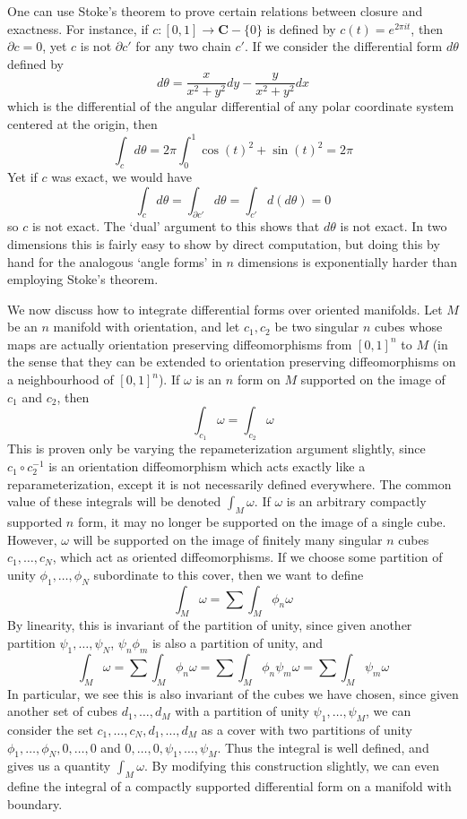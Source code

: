 One can use Stoke's theorem to prove certain relations between closure and exactness. For instance, if $c: [0,1] \to \mathbf{C} - \{ 0 \}$ is defined by $c(t) = e^{2 \pi it}$, then $\partial c = 0$, yet $c$ is not $\partial c'$ for any two chain $c'$. If we consider the differential form $d\theta$ defined by
%
\[ d\theta = \frac{x}{x^2 + y^2} dy - \frac{y}{x^2 + y^2} dx \]
%
which is the differential of the angular differential of any polar coordinate system centered at the origin, then
%
\[ \int_c d\theta = 2\pi \int_0^1 \cos(t)^2 + \sin(t)^2 = 2\pi \]
%
Yet if $c$ was exact, we would have
%
\[ \int_c d\theta = \int_{\partial c'} d\theta = \int_{c'} d(d\theta) = 0 \]
%
so $c$ is not exact. The `dual' argument to this shows that $d\theta$ is not exact. In two dimensions this is fairly easy to show by direct computation, but doing this by hand for the analogous `angle forms' in $n$ dimensions is exponentially harder than employing Stoke's theorem.

We now discuss how to integrate differential forms over oriented manifolds. Let $M$ be an $n$ manifold with orientation, and let $c_1,c_2$ be two singular $n$ cubes whose maps are actually orientation preserving diffeomorphisms from $[0,1]^n$ to $M$ (in the sense that they can be extended to orientation preserving diffeomorphisms on a neighbourhood of $[0,1]^n$). If $\omega$ is an $n$ form on $M$ supported on the image of $c_1$ and $c_2$, then
%
\[ \int_{c_1} \omega = \int_{c_2} \omega \]
%
This is proven only be varying the repameterization argument slightly, since $c_1 \circ c_2^{-1}$ is an orientation diffeomorphism which acts exactly like a reparameterization, except it is not necessarily defined everywhere. The common value of these integrals will be denoted $\int_M \omega$. If $\omega$ is an arbitrary compactly supported $n$ form, it may no longer be supported on the image of a single cube. However, $\omega$ will be supported on the image of finitely many singular $n$ cubes $c_1, \dots, c_N$, which act as oriented diffeomorphisms. If we choose some partition of unity $\phi_1, \dots, \phi_N$ subordinate to this cover, then we want to define
%
\[ \int_M \omega = \sum \int_M \phi_n \omega \]
%
By linearity, this is invariant of the partition of unity, since given another partition $\psi_1, \dots, \psi_N$, $\psi_n \phi_m$ is also a partition of unity, and
%
\[ \int_M \omega = \sum \int_M \phi_n \omega = \sum \int_M \phi_n \psi_m \omega = \sum \int_M \psi_m \omega \]
%
In particular, we see this is also invariant of the cubes we have chosen, since given another set of cubes $d_1, \dots, d_M$ with a partition of unity $\psi_1, \dots, \psi_M$, we can consider the set $c_1, \dots, c_N, d_1, \dots, d_M$ as a cover with two partitions of unity $\phi_1, \dots, \phi_N, 0, \dots, 0$ and $0, \dots, 0, \psi_1, \dots, \psi_M$. Thus the integral is well defined, and gives us a quantity $\int_M \omega$. By modifying this construction slightly, we can even define the integral of a compactly supported differential form on a manifold with boundary.






